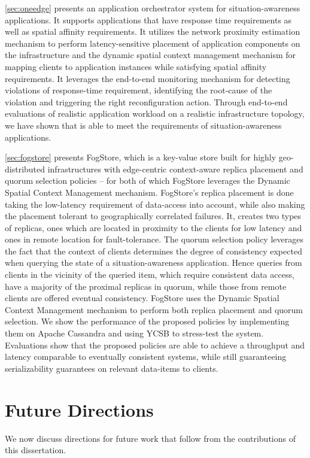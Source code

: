 \par \cref{sec:oneedge} presents an application orchestrator system for situation-awareness applications. It supports applications that have response time requirements as well as spatial affinity requirements. It utilizes the network proximity estimation mechanism to perform latency-sensitive placement of application components on the infrastructure and the dynamic spatial context management mechanism for mapping clients to application instances while satisfying spatial affinity requirements. It leverages the end-to-end monitoring mechanism for detecting violations of response-time requirement, identifying the root-cause of the violation and triggering the right reconfiguration action. Through end-to-end evaluations of realistic application workload on a realistic infrastructure topology, we have shown that \oneedge{} is able to meet the requirements of situation-awareness applications.
\par \cref{sec:fogstore} presents FogStore, which is a key-value store built for highly geo-distributed infrastructures with edge-centric context-aware replica placement and quorum selection policies -- for both of which FogStore leverages the Dynamic Spatial Context Management mechanism. FogStore's replica placement is done taking the low-latency requirement of data-access into account, while also making the placement tolerant to geographically correlated failures. It, creates two types of replicas, ones which are located in proximity to the clients for low latency and ones in remote location for fault-tolerance. The quorum selection policy leverages the fact that the context of clients determines the degree of consistency expected when querying the state of a situation-awareness application. Hence queries from clients in the vicinity of the queried item, which require consistent data access, have a majority of the proximal replicas in quorum, while those from remote clients are offered eventual consistency. FogStore uses the Dynamic Spatial Context Management mechanism to perform both replica placement and quorum selection. We show the performance of the proposed policies by implementing them on Apache Cassandra and using YCSB to stress-test the system. Evaluations show that the proposed policies are able to achieve a throughput and latency comparable to eventually consistent systems, while still guaranteeing serializability guarantees on relevant data-items to clients.

\section{Future Directions}
We now discuss directions for future work that follow from the contributions of this dissertation.
